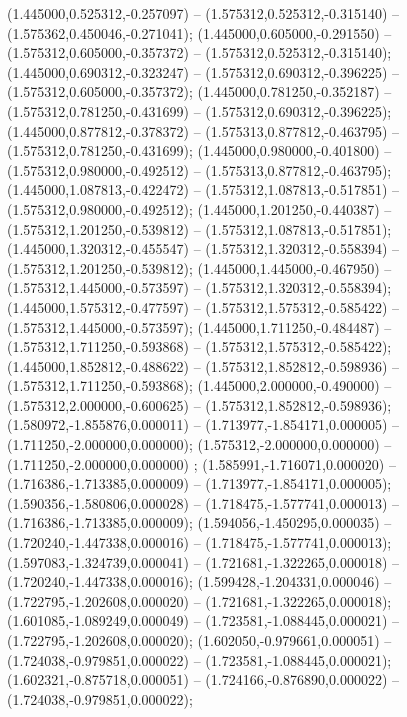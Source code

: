  (1.445000,0.525312,-0.257097) -- (1.575312,0.525312,-0.315140) -- (1.575362,0.450046,-0.271041);
 (1.445000,0.605000,-0.291550) -- (1.575312,0.605000,-0.357372) -- (1.575312,0.525312,-0.315140);
 (1.445000,0.690312,-0.323247) -- (1.575312,0.690312,-0.396225) -- (1.575312,0.605000,-0.357372);
 (1.445000,0.781250,-0.352187) -- (1.575312,0.781250,-0.431699) -- (1.575312,0.690312,-0.396225);
 (1.445000,0.877812,-0.378372) -- (1.575313,0.877812,-0.463795) -- (1.575312,0.781250,-0.431699);
 (1.445000,0.980000,-0.401800) -- (1.575312,0.980000,-0.492512) -- (1.575313,0.877812,-0.463795);
 (1.445000,1.087813,-0.422472) -- (1.575312,1.087813,-0.517851) -- (1.575312,0.980000,-0.492512);
 (1.445000,1.201250,-0.440387) -- (1.575312,1.201250,-0.539812) -- (1.575312,1.087813,-0.517851);
 (1.445000,1.320312,-0.455547) -- (1.575312,1.320312,-0.558394) -- (1.575312,1.201250,-0.539812);
 (1.445000,1.445000,-0.467950) -- (1.575312,1.445000,-0.573597) -- (1.575312,1.320312,-0.558394);
 (1.445000,1.575312,-0.477597) -- (1.575312,1.575312,-0.585422) -- (1.575312,1.445000,-0.573597);
 (1.445000,1.711250,-0.484487) -- (1.575312,1.711250,-0.593868) -- (1.575312,1.575312,-0.585422);
 (1.445000,1.852812,-0.488622) -- (1.575312,1.852812,-0.598936) -- (1.575312,1.711250,-0.593868);
 (1.445000,2.000000,-0.490000) -- (1.575312,2.000000,-0.600625) -- (1.575312,1.852812,-0.598936);
 (1.580972,-1.855876,0.000011) -- (1.713977,-1.854171,0.000005) -- (1.711250,-2.000000,0.000000);
 (1.575312,-2.000000,0.000000) -- (1.711250,-2.000000,0.000000) ;
 (1.585991,-1.716071,0.000020) -- (1.716386,-1.713385,0.000009) -- (1.713977,-1.854171,0.000005);
 (1.590356,-1.580806,0.000028) -- (1.718475,-1.577741,0.000013) -- (1.716386,-1.713385,0.000009);
 (1.594056,-1.450295,0.000035) -- (1.720240,-1.447338,0.000016) -- (1.718475,-1.577741,0.000013);
 (1.597083,-1.324739,0.000041) -- (1.721681,-1.322265,0.000018) -- (1.720240,-1.447338,0.000016);
 (1.599428,-1.204331,0.000046) -- (1.722795,-1.202608,0.000020) -- (1.721681,-1.322265,0.000018);
 (1.601085,-1.089249,0.000049) -- (1.723581,-1.088445,0.000021) -- (1.722795,-1.202608,0.000020);
 (1.602050,-0.979661,0.000051) -- (1.724038,-0.979851,0.000022) -- (1.723581,-1.088445,0.000021);
 (1.602321,-0.875718,0.000051) -- (1.724166,-0.876890,0.000022) -- (1.724038,-0.979851,0.000022);

